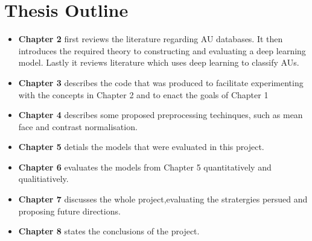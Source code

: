   \section{Thesis Outline}
    \begin{itemize}
      \item {\bf Chapter 2} first reviews the literature regarding AU databases. It then introduces the
            required theory to constructing and evaluating a deep learning model. Lastly it
            reviews literature which uses deep learning to classify AUs.
      \item {\bf Chapter 3} describes the code that was produced to facilitate experimenting with
            the concepts in Chapter 2 and to enact the goals of Chapter 1
      \item {\bf Chapter 4} describes some proposed preprocessing techinques, such as mean face
            and contrast normalisation.
      \item {\bf Chapter 5} detials the models that were evaluated in this project.
      \item {\bf Chapter 6} evaluates the models from Chapter 5 quantitatively and qualitiatively.
      \item {\bf Chapter 7} discusses the whole project,evaluating the stratergies persued and
            proposing future directions.
      \item {\bf Chapter 8} states the conclusions of the project.
  \end{itemize}
